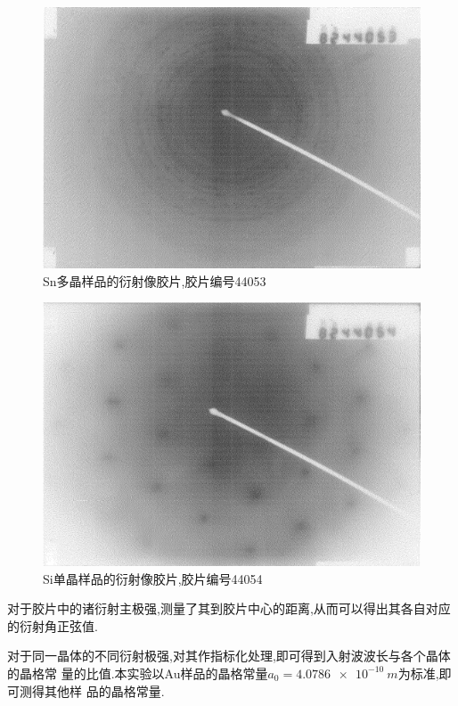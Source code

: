 \documentclass[aps,pre,12pt,preprint,onecolumn,showpacs,showkeys]{revtex4-1}
\begin{document}
\begin{figure}[htbp]
  \centering
\includegraphics[width=.7\textwidth]{2.pdf}
\caption{\label{fig:5}%
    Sn多晶样品的衍射像胶片,胶片编号44053
}
\end{figure}
\begin{figure}[htbp]
  \centering
\includegraphics[width=.7\textwidth]{6.pdf}
\caption{\label{fig:6}%
    Si单晶样品的衍射像胶片,胶片编号44054
}
\end{figure}
 
对于胶片中的诸衍射主极强,测量了其到胶片中心的距离,从而可以得出其各自对应的衍射角正弦值.

对于同一晶体的不同衍射极强,对其作指标化处理,即可得到入射波波长与各个晶体的晶格常
量的比值.本实验以Au样品的晶格常量$a_0 = \SI{4.0786e-10}{m}$为标准,即可测得其他样
品的晶格常量.
\end{document}
